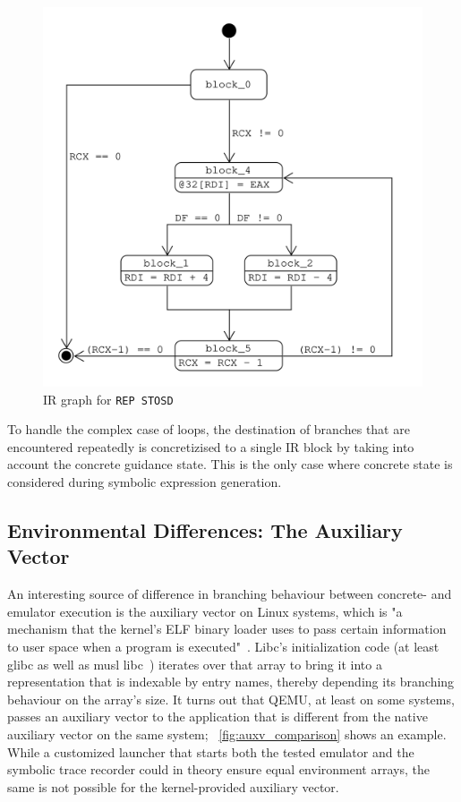 \begin{figure}[htpb]
    \centering
    \includegraphics[width=0.7\linewidth]{figures/ir_graph_repstod.png}
    \caption{IR graph for \texttt{REP STOSD}}\label{fig:ir_graph_repstod}
\end{figure}

To handle the complex case of loops, the destination of branches that are encountered repeatedly is concretizised to a
single IR block by taking into account the concrete guidance state. This is the only case where concrete state is
considered during symbolic expression generation.

\subsection{Environmental Differences: The Auxiliary Vector}\label{sec:auxv}

An interesting source of difference in branching behaviour between concrete- and emulator execution is the auxiliary
vector on Linux systems, which is "a mechanism that the kernel's ELF binary loader uses to pass certain information to
user space when a program is executed"~\cite{getauxval2024Mar}. Libc's initialization code (at least glibc as well as
musl libc~\cite{MuslLibc2024Feb}) iterates over that array to bring it into a representation that is indexable by entry
names, thereby depending its branching behaviour on the array's size. It turns out that QEMU, at least on some systems,
passes an auxiliary vector to the application that is different from the native auxiliary vector on the same system;
\figurename~\ref{fig:auxv_comparison} shows an example. While a customized launcher that starts both the tested emulator
and the symbolic trace recorder could in theory ensure equal environment arrays, the same is not possible for the
kernel-provided auxiliary vector.

